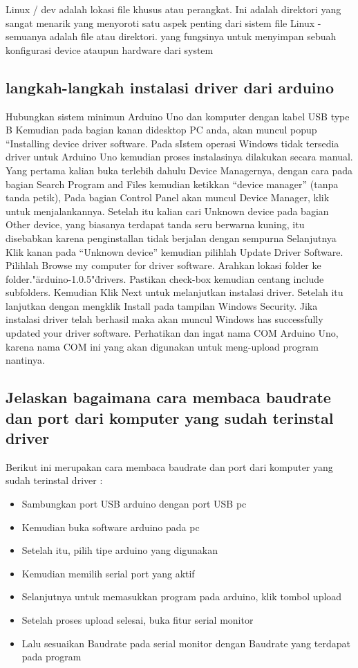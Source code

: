 Linux
/ dev adalah lokasi file khusus atau perangkat. Ini adalah direktori yang sangat menarik yang menyoroti satu aspek penting dari sistem file Linux - semuanya adalah file atau direktori. yang fungsinya untuk menyimpan sebuah konfigurasi device ataupun hardware dari system

\subsection{langkah-langkah instalasi driver dari arduino}
Hubungkan sistem minimun Arduino Uno dan komputer dengan kabel USB type B
Kemudian pada bagian kanan didesktop PC anda, akan muncul popup “Installing device driver software. Pada sIstem operasi Windows tidak tersedia driver untuk Arduino Uno kemudian proses instalasinya dilakukan secara manual.
Yang pertama kalian buka terlebih dahulu Device Managernya, dengan cara pada bagian Search Program and Files kemudian ketikkan “device manager” (tanpa tanda petik), Pada bagian Control Panel akan muncul Device Manager, klik untuk menjalankannya.
Setelah itu kalian cari Unknown device pada bagian Other device, yang biasanya terdapat tanda seru berwarna kuning, itu disebabkan karena penginstallan tidak berjalan dengan sempurna
Selanjutnya Klik kanan pada “Unknown device” kemudian pilihlah Update Driver Software.
Pilihlah Browse my computer for driver software.
Arahkan lokasi folder ke folder."\"arduino-1.0.5"\"drivers. Pastikan check-box kemudian centang include subfolders. Kemudian Klik Next untuk melanjutkan instalasi driver.
Setelah itu  lanjutkan dengan mengklik Install pada tampilan Windows Security.
Jika instalasi driver telah berhasil maka akan muncul Windows has successfully updated your driver software.
Perhatikan dan ingat nama COM Arduino Uno, karena nama COM ini yang akan digunakan untuk meng-upload program nantinya.

\subsection{Jelaskan bagaimana cara membaca baudrate dan port dari komputer yang sudah terinstal driver}
Berikut ini merupakan cara membaca baudrate dan port dari komputer yang sudah terinstal driver :
\begin{itemize}
	\item Sambungkan port USB arduino dengan port USB pc
	\item Kemudian buka software arduino pada pc
	\item Setelah itu, pilih tipe arduino yang digunakan
	\item Kemudian memilih serial port yang aktif  
	\item Selanjutnya untuk memasukkan program pada arduino, klik tombol upload
	\item Setelah proses upload selesai, buka fitur serial monitor
	\item Lalu sesuaikan Baudrate pada serial monitor dengan Baudrate yang terdapat pada program
\end{itemize}

